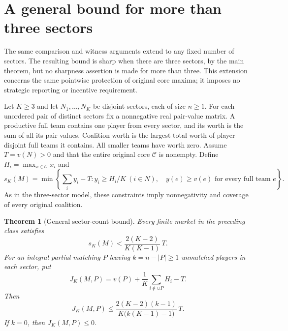 \documentclass[11pt]{article}
\newtheorem{theorem}{Theorem}[section]
\theoremstyle{remark}
\newcommand{\core}{\mathcal C}
\begin{document}
\clearpage
\appendix
\section{A general bound for more than three sectors}\label{four:section}
The same comparison and witness arguments extend to any fixed number of
sectors. The resulting bound is sharp when there are three sectors, by the
main theorem, but no sharpness assertion is made for more than three.
This extension concerns the same pointwise protection of original core
maxima; it imposes no strategic reporting or incentive requirement.

Let $K\ge3$ and let $N_1,\ldots,N_K$ be disjoint sectors, each of size
$n\ge1$. For each unordered pair of distinct sectors fix a nonnegative
real pair-value matrix. A productive full team contains one player from
every sector, and its worth is the sum of all its pair values. Coalition
worth is the largest total worth of player-disjoint full teams it contains.
All smaller teams have worth zero. Assume $T=v(N)>0$ and that the entire
original core $\core$ is nonempty. Define $H_i=\max_{x\in\core}x_i$ and
\[
 s_K(M)=\min\left\{\sum_i y_i-T:
       y_i\ge H_i/K\ (i\in N),\quad y(e)\ge v(e)
       \text{ for every full team }e\right\}.
\]
As in the three-sector model, these constraints imply nonnegativity and
coverage of every original coalition.

\begin{theorem}[General sector-count bound]\label{four:main}
Every finite market in the preceding class satisfies
\begin{equation}\label{four:universal}
             s_K(M)<\frac{2(K-2)}{K(K-1)}\,T.
\end{equation}
For an integral partial matching $P$ leaving $k=n-|P|\ge1$ unmatched
players in each sector, put
\[
 J_K(M,P)=v(P)+\frac1K\sum_{i\notin\cup P}H_i-T.
\]
Then
\begin{equation}\label{four:integral}
 J_K(M,P)\le
       \frac{2(K-2)(k-1)}{K\bigl(k(K-1)-1\bigr)}\,T.
\end{equation}
If $k=0$, then $J_K(M,P)\le0$.
\end{theorem}
\end{document}
